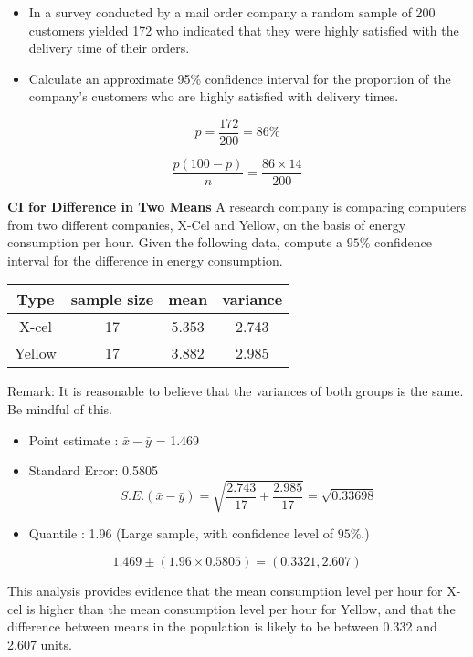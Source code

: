 \documentclass[]{report}
\begin{document}
\begin{itemize}
	\item In a survey conducted by a mail order company a random sample of 200 customers yielded 172 who indicated that they 
	were highly satisfied with the delivery time of their orders. 
	
	\item Calculate an approximate 95\% confidence interval for the proportion of the company's customers who are 
	highly satisfied with delivery times.
\end{itemize}


\[p= \frac{172}{200}= 86\%\]


\[ \frac{p(100-p)}{n} =\frac{86 \times 14}{200}\]



\noindent \textbf{CI for Difference in Two Means}
A research company is comparing computers from two different companies, X-Cel and Yellow, on the basis of energy consumption per hour. Given the following data, compute a $95\%$ confidence interval for the difference in energy consumption.
\begin{center}
	\begin{tabular}{|c|c|c|c|}
		\hline
		Type & sample size & mean & variance \\ \hline
		X-cel & 17 & 5.353 & 2.743 \\ \hline
		Yellow & 17 & 3.882 & 2.985 \\ \hline
	\end{tabular}
\end{center}
Remark: It is reasonable to believe that the variances of both groups is the same. Be mindful of this.



\begin{itemize}
	\item Point estimate : $\bar{x} - \bar{y}$ = 1.469
	\item Standard Error: 0.5805
	\[ S.E.(\bar{x}-\bar{y}) = \sqrt{\frac{2.743}{17} + \frac{2.985}{17}} = \sqrt{0.33698} \]
	\item Quantile : 1.96 (Large sample, with confidence level of $95\%$.)
\end{itemize}

\[ 1.469  \pm (1.96 \times 0.5805) = (0.3321,2.607) \]


This analysis provides evidence that the mean consumption level per hour for X-cel is higher than the mean consumption level per hour for Yellow, and that the difference between means in the population is likely to be between 0.332 and 2.607 units.
\end{document}
